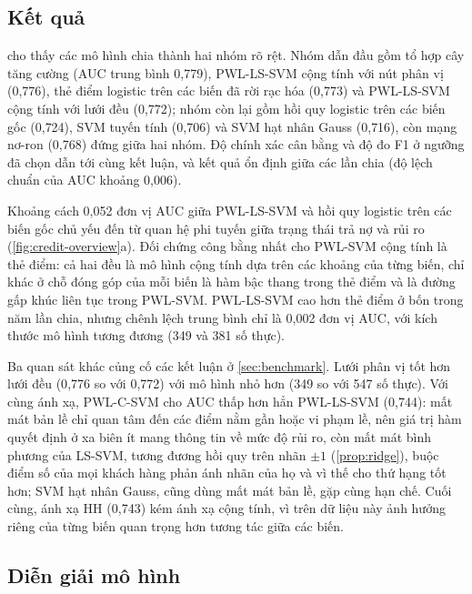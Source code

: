 \subsection{Kết quả}\label{sec:credit-results}



 cho thấy các mô hình chia thành hai nhóm rõ rệt. Nhóm dẫn đầu gồm tổ hợp cây tăng cường (AUC trung bình 0{,}779), PWL-LS-SVM cộng tính với nút phân vị (0{,}776), thẻ điểm logistic trên các biến đã rời rạc hóa (0{,}773) và PWL-LS-SVM cộng tính với lưới đều (0{,}772); nhóm còn lại gồm hồi quy logistic trên các biến gốc (0{,}724), SVM tuyến tính (0{,}706) và SVM hạt nhân Gauss (0{,}716), còn mạng nơ-ron (0{,}768) đứng giữa hai nhóm. Độ chính xác cân bằng và độ đo F1 ở ngưỡng đã chọn dẫn tới cùng kết luận, và kết quả ổn định giữa các lần chia (độ lệch chuẩn của AUC khoảng 0{,}006).

Khoảng cách 0{,}052 đơn vị AUC giữa PWL-LS-SVM và hồi quy logistic trên các biến gốc chủ yếu đến từ quan hệ phi tuyến giữa trạng thái trả nợ và rủi ro (\cref{fig:credit-overview}a). Đối chứng công bằng nhất cho PWL-SVM cộng tính là thẻ điểm: cả hai đều là mô hình cộng tính dựa trên các khoảng của từng biến, chỉ khác ở chỗ đóng góp của mỗi biến là hàm bậc thang trong thẻ điểm và là đường gấp khúc liên tục trong PWL-SVM. PWL-LS-SVM cao hơn thẻ điểm ở bốn trong năm lần chia, nhưng chênh lệch trung bình chỉ là 0{,}002 đơn vị AUC, với kích thước mô hình tương đương (349 và 381 số thực).

Ba quan sát khác củng cố các kết luận ở \cref{sec:benchmark}. Lưới phân vị tốt hơn lưới đều (0{,}776 so với 0{,}772) với mô hình nhỏ hơn (349 so với 547 số thực). Với cùng ánh xạ, PWL-C-SVM cho AUC thấp hơn hẳn PWL-LS-SVM (0{,}744): mất mát bản lề chỉ quan tâm đến các điểm nằm gần hoặc vi phạm lề, nên giá trị hàm quyết định ở xa biên ít mang thông tin về mức độ rủi ro, còn mất mát bình phương của LS-SVM, tương đương hồi quy trên nhãn $\pm1$ (\cref{prop:ridge}), buộc điểm số của mọi khách hàng phản ánh nhãn của họ và vì thế cho thứ hạng tốt hơn; SVM hạt nhân Gauss, cũng dùng mất mát bản lề, gặp cùng hạn chế. Cuối cùng, ánh xạ HH (0{,}743) kém ánh xạ cộng tính, vì trên dữ liệu này ảnh hưởng riêng của từng biến quan trọng hơn tương tác giữa các biến.

\subsection{Diễn giải mô hình}\label{sec:credit-interp}

